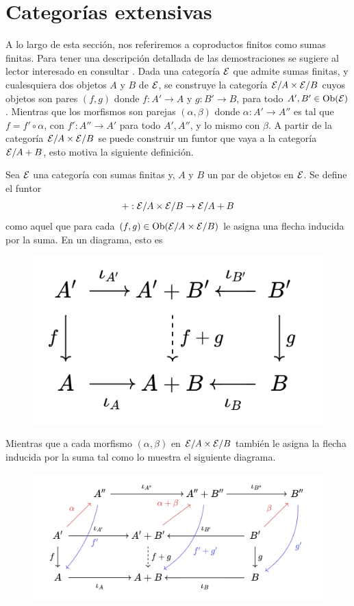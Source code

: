 \section{Categorías extensivas}
A lo largo de esta sección, nos referiremos a coproductos finitos como sumas finitas. Para tener una descripción detallada de las demostraciones se sugiere al lector interesado en consultar \cite{Merino2002}.
Dada una categoría ${\mathcal E}$ que admite sumas finitas, y cualesquiera dos objetos $A$ y $B$ de ${\mathcal E}$, se construye la categoría ${\mathcal E}/A\times{\mathcal E}/B $ cuyos objetos son pares $(f,g)$ donde $f:A'\to A$ y $g:B'\to B$, para todo $A', B'\in \operatorname{Ob}({\mathcal E})$. Mientras que los morfismos son parejas $(\alpha,\beta)$ donde $\alpha:A'\to A''$ es tal que $f=f'\circ\alpha$, con $f':A''\to A'$ para todo $A', A''$, y lo mismo con $\beta$. A partir de la categoría ${\mathcal E}/A\times{\mathcal E}/B$ se puede construir un funtor que vaya a la categoría ${\mathcal E}/A+B$, esto motiva la siguiente definición.
\begin{definition}
    Sea ${\mathcal E}$ una categoría con sumas finitas y, $A$ y $B$ un par de objetos en ${\mathcal E}$. Se define el funtor 
    \begin{eqnarray*}
        +:{\mathcal E}/A\times{\mathcal E}/B\to{\mathcal E}/A+B
    \end{eqnarray*}
    como aquel que para cada $(f,g)\in\operatorname{Ob}({\mathcal E}/A\times{\mathcal E}/B)$ le asigna una flecha inducida por la suma. En un diagrama, esto es
    \begin{figure}[H]
        \centering
        \includegraphics[width=0.35\linewidth]{img/diagrama1.5.1.png}
    \end{figure}
    Mientras que a cada morfismo $(\alpha,\beta)$ en ${\mathcal E}/A\times{\mathcal E}/B$ también le asigna la flecha inducida por la suma tal como lo muestra el siguiente diagrama.
        \begin{figure}[H]
        \centering
        \includegraphics[width=0.75\linewidth]{img/diagram1.5.2.png}
    \end{figure}
\end{definition}

